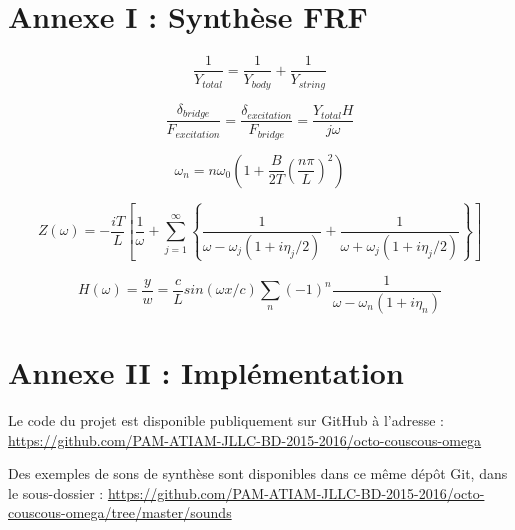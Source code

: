 \newpage
\section*{Annexe I : Synthèse FRF}

\begin{equation}
  \frac{1}{Y_{total}} = \frac{1}{Y_{body}} + \frac{1}{Y_{string}}
  \label{eq:eq_frf_1}
\end{equation}

\begin{equation}
  \frac{\delta_{bridge}}{F_{excitation}} = \frac{\delta_{excitation}}{F_{bridge}} = \frac{Y_{total}H}{j\omega}
  \label{eq:eq_frf_2}
\end{equation}

\begin{equation}
	\omega_n = n\omega_0\left(1+\frac{B}{2T}(\frac{n\pi}{L})^2\right)
 \label{eq:eq_frf_3}
\end{equation}


\begin{equation}
 Z(\omega) = -\frac{iT}{L} \left[ \frac{1}{\omega} + \sum_{j=1}^{\infty} \left\lbrace \frac{1}{\omega - \omega_j (1+ i\eta_j/2)} + \frac{1}{\omega + \omega_j (1+ i\eta_j/2)} \right\rbrace  \right]
  \label{eq:eq_frf_4}
\end{equation}

\begin{equation}
H(\omega) = \frac{y}{w} = \frac{c}{L} sin(\omega x/c )\sum_n (-1)^n \frac{1}{\omega - \omega_n(1 + i\eta_n)}
  \label{eq:eq_frf_5}
\end{equation}

\section*{Annexe II : Implémentation}

Le code du projet est disponible publiquement sur GitHub à l'adresse :
\url{https://github.com/PAM-ATIAM-JLLC-BD-2015-2016/octo-couscous-omega}

Des exemples de sons de synthèse sont disponibles dans ce même dépôt Git,
dans le sous-dossier :
\url{https://github.com/PAM-ATIAM-JLLC-BD-2015-2016/octo-couscous-omega/tree/master/sounds}

